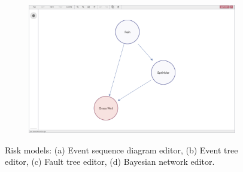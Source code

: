 \begin{figure}[h!]
\begin{subfigure}[b]{0.48\textwidth}
    \caption{}
  \end{subfigure}
  \begin{subfigure}[b]{0.48\textwidth}
    \centering
    \includegraphics[width=\textwidth]{4_proposed_solution/web_app/figures/bn.png}
    \caption{}
  \end{subfigure}
  \caption{Risk models: (a) Event sequence diagram editor, (b) Event tree editor, (c) Fault tree editor, (d) Bayesian network editor.}
  \label{fig:risk_models}
\end{figure}